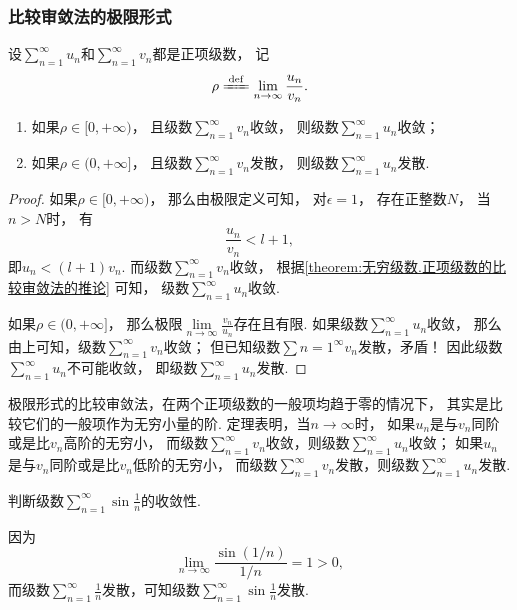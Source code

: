 \subsubsection{比较审敛法的极限形式}
\begin{theorem}[比较审敛法的极限形式]\label{theorem:无穷级数.正项级数的比较审敛法的极限形式}
设\(\sum\limits_{n=1}^\infty u_n\)和\(\sum\limits_{n=1}^\infty v_n\)都是正项级数，
记\[
	\rho
	\defeq
	\lim\limits_{n\to\infty} \frac{u_n}{v_n}.
\]
\begin{enumerate}
	\item 如果\(\rho\in[0,+\infty)\)，
	且级数\(\sum\limits_{n=1}^\infty v_n\)收敛，
	则级数\(\sum\limits_{n=1}^\infty u_n\)收敛；

	\item 如果\(\rho\in(0,+\infty]\)，
	且级数\(\sum\limits_{n=1}^\infty v_n\)发散，
	则级数\(\sum\limits_{n=1}^\infty u_n\)发散.
\end{enumerate}
\begin{proof}
如果\(\rho\in[0,+\infty)\)，
那么由极限定义可知，
对\(\epsilon=1\)，
存在正整数\(N\)，
当\(n>N\)时，
有\[
	\frac{u_n}{v_n} < l+1,
\]
即\(u_n < (l+1) v_n\).
而级数\(\sum\limits_{n=1}^\infty v_n\)收敛，
根据\cref{theorem:无穷级数.正项级数的比较审敛法的推论} 可知，
级数\(\sum\limits_{n=1}^\infty u_n\)收敛.

如果\(\rho\in(0,+\infty]\)，
那么极限\(\lim\limits_{n\to\infty} \frac{v_n}{u_n}\)存在且有限.
如果级数\(\sum\limits_{n=1}^\infty u_n\)收敛，
那么由上可知，级数\(\sum\limits_{n=1}^\infty v_n\)收敛；
但已知级数\(\sum\limits{n=1}^\infty v_n\)发散，矛盾！
因此级数\(\sum\limits_{n=1}^\infty u_n\)不可能收敛，
即级数\(\sum\limits_{n=1}^\infty u_n\)发散.
\end{proof}
\end{theorem}

极限形式的比较审敛法，在两个正项级数的一般项均趋于零的情况下，
其实是比较它们的一般项作为无穷小量的阶.
定理表明，当\(n \to \infty\)时，
如果\(u_n\)是与\(v_n\)同阶或是比\(v_n\)高阶的无穷小，
而级数\(\sum\limits_{n=1}^\infty v_n\)收敛，则级数\(\sum\limits_{n=1}^\infty u_n\)收敛；
如果\(u_n\)是与\(v_n\)同阶或是比\(v_n\)低阶的无穷小，
而级数\(\sum\limits_{n=1}^\infty v_n\)发散，则级数\(\sum\limits_{n=1}^\infty u_n\)发散.

\begin{example}
判断级数\(\sum\limits_{n=1}^\infty \sin\frac{1}{n}\)的收敛性.
\begin{solution}
因为\[
\lim\limits_{n\to\infty} \frac{\sin(1/n)}{1/n} = 1 > 0,
\]而级数\(\sum\limits_{n=1}^\infty \frac{1}{n}\)发散，可知级数\(\sum\limits_{n=1}^\infty \sin\frac{1}{n}\)发散.
\end{solution}
\end{example}

